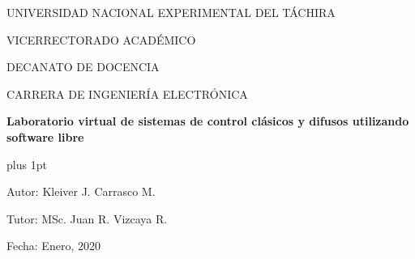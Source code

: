 \begin{center}
	\begin{spacing}{1}
		UNIVERSIDAD NACIONAL EXPERIMENTAL DEL TÁCHIRA
		
		VICERRECTORADO ACADÉMICO
		
		DECANATO DE DOCENCIA
		
		CARRERA DE INGENIERÍA ELECTRÓNICA
	
		\vspace{30pt}

		{\large \textbf{Laboratorio virtual de sistemas de control clásicos y difusos utilizando software libre}\par}
	
	\end{spacing}
\end{center}

\vspace{20pt}

\begin{flushright}
	\begin{spacing}{1}
		\parskip=0pt plus 1pt

		Autor: Kleiver J. Carrasco M.

		Tutor: MSc. Juan R. Vizcaya R.

		Fecha: Enero, 2020
		
	\end{spacing}	
\end{flushright}

\vspace{10pt}

\begin{abstract}
	\blindtext
	\blindtext
\end{abstract}

